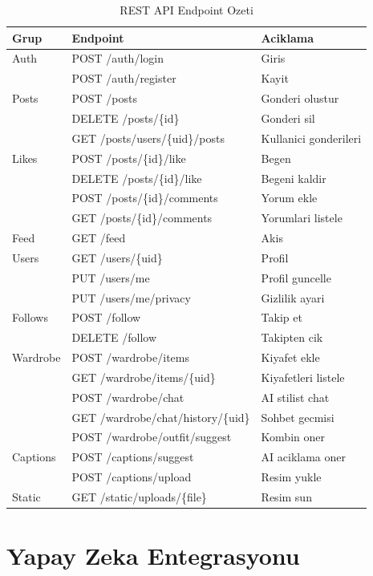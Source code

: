 \documentclass[conference]{IEEEtran}
\begin{document}
\begin{table}[h]
\caption{REST API Endpoint Ozeti}
\label{tab:api}
\centering
\begin{tabular}{lll}
\toprule
\textbf{Grup} & \textbf{Endpoint} & \textbf{Aciklama} \\
\midrule
Auth & POST /auth/login & Giris \\
     & POST /auth/register & Kayit \\
\midrule
Posts & POST /posts & Gonderi olustur \\
      & DELETE /posts/\{id\} & Gonderi sil \\
      & GET /posts/users/\{uid\}/posts & Kullanici gonderileri \\
\midrule
Likes & POST /posts/\{id\}/like & Begen \\
      & DELETE /posts/\{id\}/like & Begeni kaldir \\
      & POST /posts/\{id\}/comments & Yorum ekle \\
      & GET /posts/\{id\}/comments & Yorumlari listele \\
\midrule
Feed & GET /feed & Akis \\
\midrule
Users & GET /users/\{uid\} & Profil \\
      & PUT /users/me & Profil guncelle \\
      & PUT /users/me/privacy & Gizlilik ayari \\
\midrule
Follows & POST /follow & Takip et \\
        & DELETE /follow & Takipten cik \\
\midrule
Wardrobe & POST /wardrobe/items & Kiyafet ekle \\
         & GET /wardrobe/items/\{uid\} & Kiyafetleri listele \\
         & POST /wardrobe/chat & AI stilist chat \\
         & GET /wardrobe/chat/history/\{uid\} & Sohbet gecmisi \\
         & POST /wardrobe/outfit/suggest & Kombin oner \\
\midrule
Captions & POST /captions/suggest & AI aciklama oner \\
         & POST /captions/upload & Resim yukle \\
\midrule
Static & GET /static/uploads/\{file\} & Resim sun \\
\bottomrule
\end{tabular}
\end{table}

\section{Yapay Zeka Entegrasyonu}
\end{document}
